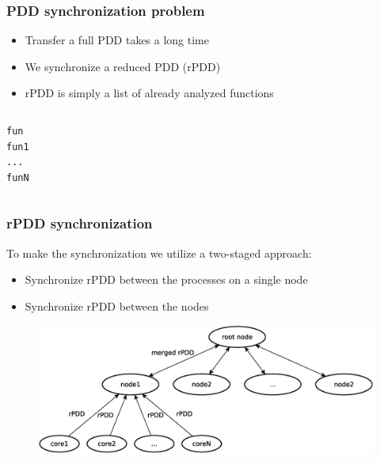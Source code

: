 
\begin{frame}[fragile]
\frametitle{PDD synchronization problem}
\begin{itemize}
\item Transfer a full PDD takes a long time
\item We synchronize a reduced PDD (rPDD)
\item rPDD is simply a list of already analyzed functions
\end{itemize}
\begin{columns} 
\begin{lstlisting}[style=crs_cpp] 
fun
fun1
...
funN
\end{lstlisting} 
\end{columns}
\end{frame}


\begin{frame}
\frametitle{rPDD synchronization}
To make the synchronization we utilize a two-staged approach:
	\begin{itemize}
		\item Synchronize rPDD between the processes on a single node
		\item Synchronize rPDD between the nodes
\end{itemize}
	\begin{figure}
		\includegraphics[width=115mm]{image/pddMerge}
	\end{figure}	
\end{frame}


